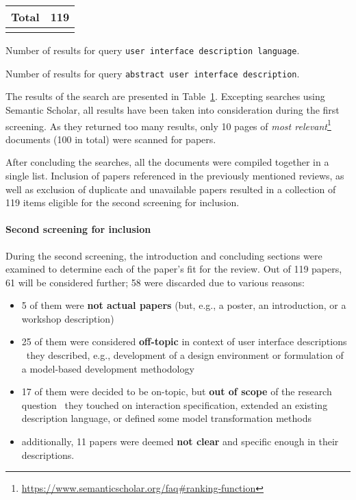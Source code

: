 \begin{table}[]
\begin{threeparttable}[b]
\begin{tabular}{@{}rrcc@{}}
            \midrule
            \multicolumn{3}{r}{\textbf{Total}} & 119 \\
            \bottomrule
            \label{tab:results-first-stage-review-rq-1}
        \end{tabular}
        \begin{tablenotes}
            \item [1] Number of results for query \texttt{user interface description language}.
            \item [2] Number of results for query \texttt{abstract user interface description}.
        \end{tablenotes}
    \end{threeparttable}
\end{table}

The results of the search are presented in Table~\ref{tab:results-first-stage-review-rq-1}.
Excepting searches using Semantic Scholar, all results have been taken into consideration during the first screening.
As they returned too many results, only 10 pages of \emph{most relevant}\footnote{\url{https://www.semanticscholar.org/faq\#ranking-function}} documents (100 in total) were scanned for papers.

After concluding the searches, all the documents were compiled together in a single list.
Inclusion of papers referenced in the previously mentioned reviews, as well as exclusion of duplicate and unavailable papers resulted in a collection of 119 items eligible for the second screening for inclusion.

\paragraph{Second screening for inclusion}

During the second screening, the introduction and concluding sections were examined to determine each of the paper's fit for the review.
Out of 119 papers, 61 will be considered further;
58 were discarded due to various reasons:
\begin{itemize}
    \item 5 of them were \textbf{not actual papers} (but, e.g., a poster, an introduction, or a workshop description)
    \item 25 of them were considered \textbf{off-topic} in context of user interface descriptions \textendash\ they described, e.g., development of a design environment or formulation of a model-based development methodology
    \item 17 of them were decided to be on-topic, but \textbf{out of scope} of the research question \textendash\ they touched on interaction specification, extended an existing description language, or defined some model transformation methods
    \item additionally, 11 papers were deemed \textbf{not clear} and specific enough in their descriptions.
\end{itemize}


